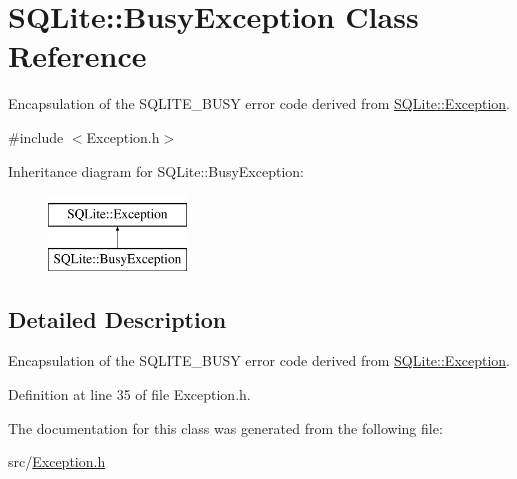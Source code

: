 \hypertarget{a00003}{\section{S\-Q\-Lite\-:\-:Busy\-Exception Class Reference}
\label{a00003}
}


Encapsulation of the S\-Q\-L\-I\-T\-E\-\_\-\-B\-U\-S\-Y error code derived from \hyperlink{a00006}{S\-Q\-Lite\-::\-Exception}.  




{\ttfamily \#include $<$Exception.\-h$>$}

Inheritance diagram for S\-Q\-Lite\-:\-:Busy\-Exception\-:\begin{figure}[H]
\begin{center}
\leavevmode
\includegraphics[height=2.000000cm]{a00003}
\end{center}
\end{figure}


\subsection{Detailed Description}
Encapsulation of the S\-Q\-L\-I\-T\-E\-\_\-\-B\-U\-S\-Y error code derived from \hyperlink{a00006}{S\-Q\-Lite\-::\-Exception}. 



Definition at line 35 of file Exception.\-h.



The documentation for this class was generated from the following file\-:\begin{DoxyCompactItemize}
\item 
src/\hyperlink{a00024}{Exception.\-h}\end{DoxyCompactItemize}
